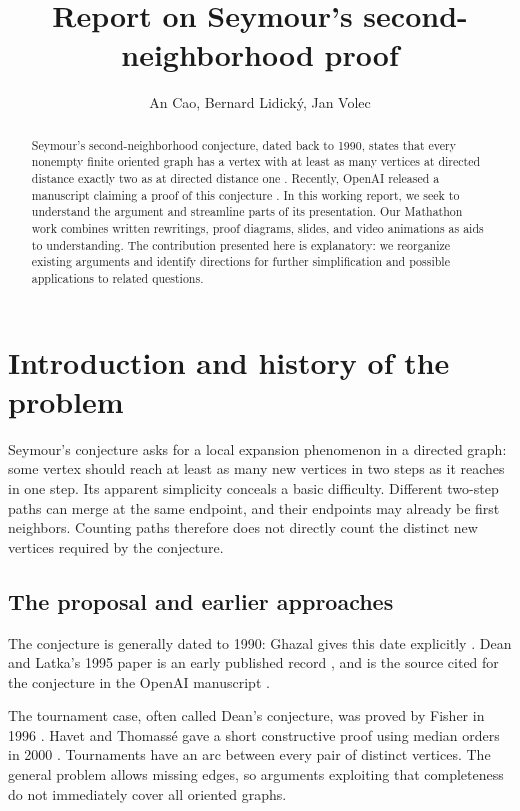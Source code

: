 \documentclass[11pt]{article}
\title{Report on Seymour's second-neighborhood proof}
\author{An Cao, Bernard Lidick\'y, Jan Volec}
\begin{document}
\maketitle
\vspace{-1.5em}

\begin{abstract}
Seymour's second-neighborhood conjecture, dated back to 1990, states
that every nonempty finite oriented graph has a vertex with at least as
many vertices at directed distance exactly two as at directed distance
one \cite{ghazal}. Recently, OpenAI released a manuscript claiming a
proof of this conjecture \cite{openai}. In this working report, we seek
to understand the argument and streamline parts of its presentation.
Our Mathathon work combines written
rewritings, proof diagrams, slides, and video animations as aids to
understanding. The contribution presented here is explanatory: we
reorganize existing arguments and identify directions for further
simplification and possible applications to related questions.
\end{abstract}

\section{Introduction and history of the problem}
\label{sec:intro}
\label{sec:history}

Seymour's conjecture asks for a local expansion phenomenon in a directed
graph: some vertex should reach at least as many new vertices in two
steps as it reaches in one step. Its apparent simplicity conceals a
basic difficulty. Different two-step paths can merge at the same
endpoint, and their endpoints may already be first neighbors. Counting
paths therefore does not directly count the distinct new vertices
required by the conjecture.

\subsection{The proposal and earlier approaches}
The conjecture is generally dated to 1990: Ghazal gives this date
explicitly \cite[p.~183]{ghazal}. Dean and Latka's 1995 paper is an
early published record \cite{deanlatka}, and is the source cited for
the conjecture in the OpenAI manuscript \cite[Section 1]{openai}.

The tournament case, often called Dean's conjecture, was proved by
Fisher in 1996 \cite{fisher}. Havet and Thomass\'e gave a short
constructive proof using median orders in 2000 \cite{havet}.
Tournaments have an arc between every pair of distinct vertices. The
general problem allows missing edges, so arguments exploiting that
completeness do not immediately cover all oriented graphs.
\end{document}
